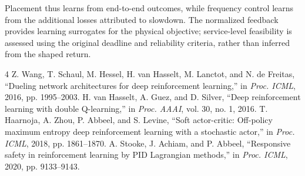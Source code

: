 \documentclass[10pt,twocolumn]{article}
\begin{document}
Placement thus learns from end-to-end outcomes, while frequency control
learns from the additional losses attributed to slowdown. The normalized
feedback provides learning surrogates for the physical objective;
service-level feasibility is assessed using the original deadline and
reliability criteria, rather than inferred from the shaped return.

\begin{thebibliography}{4}
Z. Wang, T. Schaul, M. Hessel, H. van Hasselt, M. Lanctot, and
N. de Freitas, ``Dueling network architectures for deep reinforcement
learning,'' in \emph{Proc. ICML}, 2016, pp. 1995--2003.
H. van Hasselt, A. Guez, and D. Silver, ``Deep reinforcement learning
with double Q-learning,'' in \emph{Proc. AAAI}, vol. 30, no. 1, 2016.
T. Haarnoja, A. Zhou, P. Abbeel, and S. Levine, ``Soft actor-critic:
Off-policy maximum entropy deep reinforcement learning with a stochastic
actor,'' in \emph{Proc. ICML}, 2018, pp. 1861--1870.
A. Stooke, J. Achiam, and P. Abbeel, ``Responsive safety in reinforcement
learning by PID Lagrangian methods,'' in \emph{Proc. ICML}, 2020,
pp. 9133--9143.
\end{thebibliography}
\end{document}
